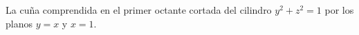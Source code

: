 \item La cuña comprendida en el primer octante cortada del cilindro $y^2 + z^2 = 1$ por los planos $y = x$ y $x = 1$.
